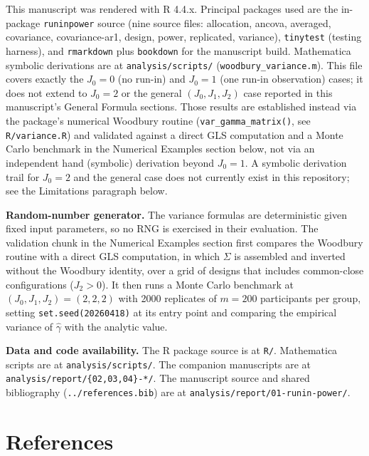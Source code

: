 \documentclass[
  11pt,
]{article}
\begin{document}
This manuscript was rendered with R 4.4.x. Principal packages
used are the in-package \texttt{runinpower} source (nine source
files: allocation, ancova, averaged, covariance,
covariance-ar1, design, power, replicated, variance),
\texttt{tinytest} (testing harness), and \texttt{rmarkdown} plus
\texttt{bookdown} for the manuscript build. Mathematica symbolic
derivations are at \texttt{analysis/scripts/}
(\texttt{woodbury\_variance.m}). This file covers exactly the
\(J_0 = 0\) (no run-in) and \(J_0 = 1\) (one run-in observation)
cases; it does not extend to \(J_0 = 2\) or the general
\((J_0, J_1, J_2)\) case reported in this manuscript's General
Formula sections. Those results are established instead via
the package's numerical Woodbury routine
(\texttt{var\_gamma\_matrix()}, see \texttt{R/variance.R}) and validated
against a direct GLS computation and a Monte Carlo benchmark
in the Numerical Examples section below, not via an
independent hand (symbolic) derivation beyond \(J_0 = 1\). A
symbolic derivation trail for \(J_0 = 2\) and the general case
does not currently exist in this repository; see the
Limitations paragraph below.

\textbf{Random-number generator.} The variance formulas are
deterministic given fixed input parameters, so no RNG is
exercised in their evaluation. The validation chunk in the
Numerical Examples section first compares the Woodbury
routine with a direct GLS computation, in which \(\Sigma\) is
assembled and inverted without the Woodbury identity, over
a grid of designs that includes common-close configurations
(\(J_2 > 0\)). It then runs a Monte Carlo benchmark at
\((J_0, J_1, J_2) = (2, 2, 2)\) with 2000 replicates of
\(m = 200\) participants per group, setting
\texttt{set.seed(20260418)} at its entry point and comparing the
empirical variance of \(\hat\gamma\) with the analytic value.

\textbf{Data and code availability.} The R package source is at
\texttt{R/}. Mathematica scripts are at \texttt{analysis/scripts/}. The
companion manuscripts are at
\texttt{analysis/report/\{02,03,04\}-*/}. The manuscript source and shared
bibliography (\texttt{../references.bib}) are at
\texttt{analysis/report/01-runin-power/}.

\section{References}\label{references}
\end{document}
